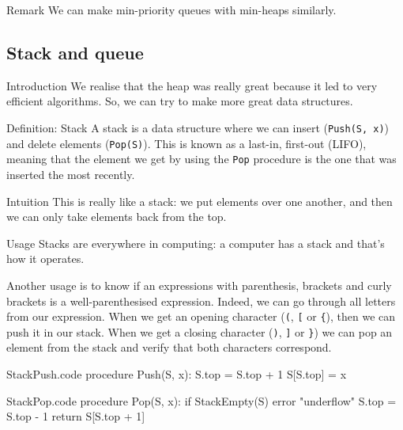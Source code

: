 \documentclass[a4paper]{article}
\begin{document}
\begin{parag}{Remark}
    We can make min-priority queues with min-heaps similarly.
\end{parag}

\subsection{Stack and queue}
\begin{parag}{Introduction}
    We realise that the heap was really great because it led to very efficient algorithms. So, we can try to make more great data structures.
\end{parag}

\begin{parag}{Definition: Stack}
    A stack is a data structure where we can insert (\texttt{Push(S, x)}) and delete elements (\texttt{Pop(S)}). This is known as a last-in, first-out (LIFO), meaning that the element we get by using the \texttt{Pop} procedure is the one that was inserted the most recently.

    \begin{subparag}{Intuition}
        This is really like a stack: we put elements over one another, and then we can only take elements back from the top.
    \end{subparag}

    \begin{subparag}{Usage}
        Stacks are everywhere in computing: a computer has a stack and that's how it operates.

        Another usage is to know if an expressions with parenthesis, brackets and curly brackets is a well-parenthesised expression. Indeed, we can go through all letters from our expression. When we get an opening character (\texttt{(}, \texttt{[} or \texttt{\{}), then we can push it in our stack. When we get a closing character (\texttt{)}, \texttt{]} or \texttt{\}}) we can pop an element from the stack and verify that both characters correspond.
    \end{subparag}
    
\end{parag}

\begin{filecontents*}[overwrite]{StackPush.code}
procedure Push(S, x):
    S.top = S.top + 1
    S[S.top] = x
\end{filecontents*}

\begin{filecontents*}[overwrite]{StackPop.code}
procedure Pop(S, x):
    if StackEmpty(S)
        error "underflow"
    S.top = S.top - 1
    return S[S.top + 1]
\end{filecontents*}
\end{document}
